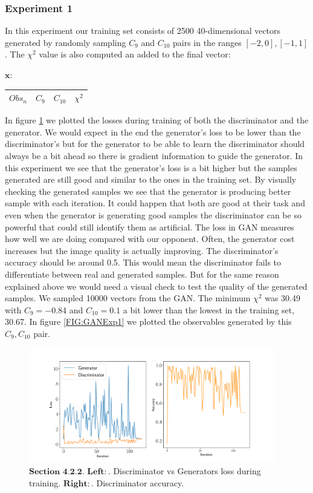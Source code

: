 \documentclass[a4paper,fleqn]{cas-dc}
\begin{document}
\subsubsection{Experiment 1}
 In this experiment our training set consists of 2500 40-dimensional vectors generated by randomly sampling \(C_9\) and \(C_{10}\) pairs in the ranges \([-2,0],  [-1,1] \). The \(\chi^2 \) value is also computed an added to the final vector:
\begin{center}
	\(\boldsymbol{x:} \)
	\quad
	\begin{tabular}{ |c|c|c|c|  } 
		\hline
		\(Obs_n \) &\(C_9\) & \(C_{10}\)& \(\chi^2 \)\\ 
		
		\hline
	\end{tabular}
\end{center}

 In figure \ref{FIG:gendis} we plotted the losses during training of both the discriminator and the generator. We would expect in the end the generator's loss to be lower than the discriminator's but for the generator to be able to learn the discriminator should always be a bit ahead so there is gradient information to guide the generator. In this experiment we see that the generator's loss is a bit higher but the samples generated are still good and similar to the ones in the training set. By visually checking the generated samples we see that the generator is producing better sample with each iteration. It could happen that both are good at their task and even when the generator is generating good samples the discriminator can be so powerful that could still identify them as artificial. The loss in GAN measures how well we are doing compared with our opponent. Often, the generator cost increases but the image quality is actually improving.  The discriminator's accuracy should be around  0.5. This would mean the discriminator fails to differentiate between real and generated samples. But for the same reason explained above we would need a visual check to test the quality of the generated samples.  
We sampled 10000 vectors from the GAN. The minimum \(\chi^2 \) was 30.49 with \(C_9 =-0.84\) and \(C_{10} = 0.1 \) a bit lower than the lowest in the training set, 30.67. In figure \ref{FIG:GANExp1} we plotted the observables generated by this \(C_9, C_{10}\) pair.

\begin{figure}
	\centering
	\includegraphics[width=\textwidth,height=5cm]{images/gendis.pdf}
	\caption{\(\textbf{Section 4.2.2}.\) \(\textbf{Left}: \). Discriminator vs Generators loss during training. \(\textbf{Right}: \). Discriminator accuracy.}
	\label{FIG:gendis}
\end{figure}
\end{document}
